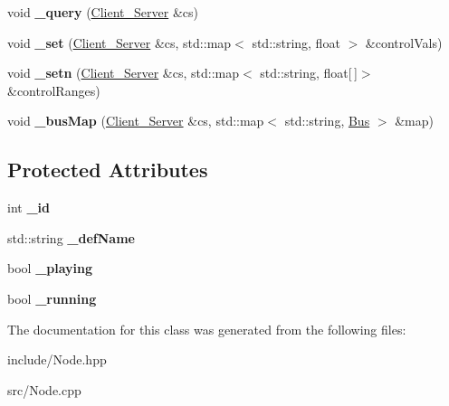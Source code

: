 \begin{DoxyCompactItemize}
\item 
\hypertarget{classColliderPlusPlus_1_1Node_ae7c26584a0d757d76ae6c3ce58e8fd9f}{void {\bfseries \-\_\-query} (\hyperlink{classColliderPlusPlus_1_1Client__Server}{Client\-\_\-\-Server} \&cs)}\label{classColliderPlusPlus_1_1Node_ae7c26584a0d757d76ae6c3ce58e8fd9f}

\item 
\hypertarget{classColliderPlusPlus_1_1Node_a24201cfbe86e712cdd17313a54079d3a}{void {\bfseries \-\_\-set} (\hyperlink{classColliderPlusPlus_1_1Client__Server}{Client\-\_\-\-Server} \&cs, std\-::map$<$ std\-::string, float $>$ \&control\-Vals)}\label{classColliderPlusPlus_1_1Node_a24201cfbe86e712cdd17313a54079d3a}

\item 
\hypertarget{classColliderPlusPlus_1_1Node_a9dd9bee73c31baa6e3584e81a06a2ad0}{void {\bfseries \-\_\-setn} (\hyperlink{classColliderPlusPlus_1_1Client__Server}{Client\-\_\-\-Server} \&cs, std\-::map$<$ std\-::string, float\mbox{[}$\,$\mbox{]}$>$ \&control\-Ranges)}\label{classColliderPlusPlus_1_1Node_a9dd9bee73c31baa6e3584e81a06a2ad0}

\item 
\hypertarget{classColliderPlusPlus_1_1Node_a8b6f3b2a7274fe1a95cb309ed4dd60cb}{void {\bfseries \-\_\-bus\-Map} (\hyperlink{classColliderPlusPlus_1_1Client__Server}{Client\-\_\-\-Server} \&cs, std\-::map$<$ std\-::string, \hyperlink{classColliderPlusPlus_1_1Bus}{Bus} $>$ \&map)}\label{classColliderPlusPlus_1_1Node_a8b6f3b2a7274fe1a95cb309ed4dd60cb}

\end{DoxyCompactItemize}
\subsection*{Protected Attributes}
\begin{DoxyCompactItemize}
\item 
\hypertarget{classColliderPlusPlus_1_1Node_a089f73464d3a7c0f9f7432a02779cafa}{int {\bfseries \-\_\-id}}\label{classColliderPlusPlus_1_1Node_a089f73464d3a7c0f9f7432a02779cafa}

\item 
\hypertarget{classColliderPlusPlus_1_1Node_ad37555cf7d7cbccf7dc564cf9fb519b3}{std\-::string {\bfseries \-\_\-def\-Name}}\label{classColliderPlusPlus_1_1Node_ad37555cf7d7cbccf7dc564cf9fb519b3}

\item 
\hypertarget{classColliderPlusPlus_1_1Node_a6e76eb59c93e21a54e6ce3c1635b107e}{bool {\bfseries \-\_\-playing}}\label{classColliderPlusPlus_1_1Node_a6e76eb59c93e21a54e6ce3c1635b107e}

\item 
\hypertarget{classColliderPlusPlus_1_1Node_af8d1c6e6e3997fd110158816282490a9}{bool {\bfseries \-\_\-running}}\label{classColliderPlusPlus_1_1Node_af8d1c6e6e3997fd110158816282490a9}

\end{DoxyCompactItemize}


The documentation for this class was generated from the following files\-:\begin{DoxyCompactItemize}
\item 
include/Node.\-hpp\item 
src/Node.\-cpp\end{DoxyCompactItemize}
